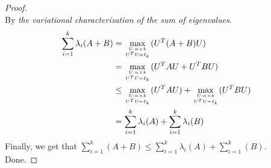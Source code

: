 \documentclass[a4paper]{article}
\begin{document}
\begin{description}
  \begin{proof}\ \\
    By \textit{the variational characterization of the sum of eigenvalues}.
    \begin{align*}
      \sum_{i=1}^{k}\lambda_{i}(A+B)&=\max\limits_{U: n\times k \atop U^{T}U=I_{k}}(U^{T}(A+B)U)\\
      &=\max\limits_{U: n\times k\atop U^{T}U=I_{k}}(U^{T}AU+U^{T}BU)\\
      &\le \max\limits_{U: n\times k\atop U^{T}U=I_{k}}(U^{T}AU)+\max\limits_{U: n\times k\atop U^{T}U=I_{k}}(U^{T}BU)\\
      &=\sum_{i=1}^{k}\lambda_{i}(A)+\sum_{i=1}^{k}\lambda_{i}(B)
    \end{align*}
    Finally, we get that $\sum_{i=1}^{k}(A+B)\le \sum_{i=1}^{k}\lambda_{i}(A)+\sum_{i=1}^{k}(B)$.\\
    Done.
  \end{proof}


\end{description}
\end{document}
